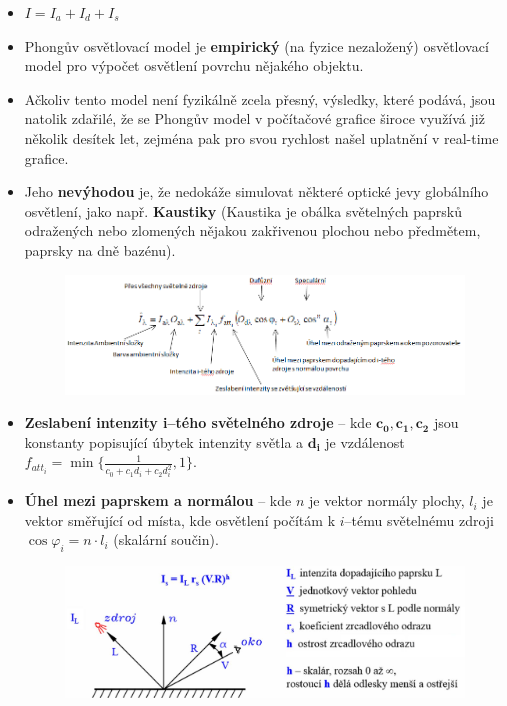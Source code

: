 \begin{itemize}
	\item $I = I_a + I_d + I_s$ 
	\item Phongův osvětlovací model je \textbf{empirický} (na fyzice nezaložený) osvětlovací model pro výpočet osvětlení povrchu nějakého objektu.
	\item Ačkoliv tento model není fyzikálně zcela přesný, výsledky, které podává, jsou natolik zdařilé, že se Phongův model v počítačové grafice široce využívá již několik desítek let, zejména pak pro svou rychlost našel uplatnění v real-time grafice.
	\item Jeho \textbf{nevýhodou} je, že nedokáže simulovat některé optické jevy globálního osvětlení, jako např. \textbf{Kaustiky} (Kaustika je obálka světelných paprsků odražených nebo zlomených nějakou zakřivenou plochou nebo předmětem, paprsky na dně bazénu).
		\begin{figure}[H]
		\centering
		\includegraphics[width=1\textwidth]{assets/1_phong_model}
		\end{figure}
	
\item \textbf{Zeslabení intenzity i--tého světelného zdroje} -- kde $\mathbf{c_0,c_1,c_2}$ jsou konstanty popisující úbytek intenzity světla a $\mathbf{d_i}$ je vzdálenost $f_{att_i} = \min \{\frac{1}{c_0+c_1d_i + c_2d_i^2}, 1\}$.
\item \textbf{Úhel mezi paprskem a normálou} -- kde $n$ je vektor normály plochy, $l_i$ je vektor směřující od místa, kde osvětlení počítám k $i$--tému světelnému zdroji $\cos{\varphi_i} = n \cdot l_i$ (skalární součin).
\begin{figure}[H]
\centering
\includegraphics[width=1\textwidth]{assets/1_phong_zrcadlo}
\end{figure}
\end{itemize}

